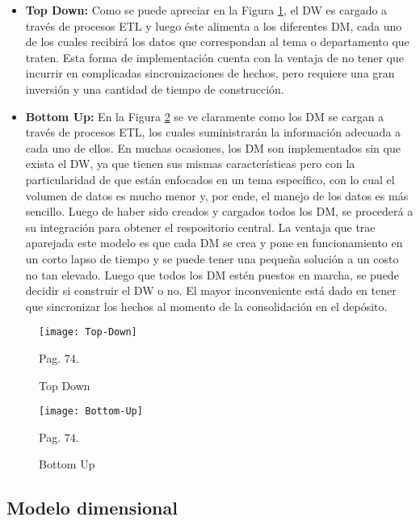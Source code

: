 \documentclass[a4paper,11pt]{article}
\begin{document}
\begin{flushleft}
    \begin{itemize}
      \item \textbf{Top Down:} Como se puede apreciar en la Figura \ref{top_down}, el DW es cargado a través de procesos ETL y luego éste alimenta a los
      diferentes DM, cada uno de los cuales recibirá los datos que correspondan al tema o departamento que traten. Esta forma de implementación cuenta
      con la ventaja de no tener que incurrir en complicadas sincronizaciones de hechos, pero requiere una gran inversión y una cantidad de tiempo de
      construcción.
      \item \textbf{Bottom Up:} En la Figura \ref{bottom_up} se ve claramente como los DM se cargan a través de procesos ETL, los cuales suministrarán la
      información adecuada a cada uno de ellos. En muchas ocasiones, los DM son implementados sin que exista el DW, ya que tienen sus mismas 
      características pero con la particularidad de que están enfocados en un tema específico, con lo cual el volumen de datos es mucho menor y, por ende,
      el manejo de los datos es más sencillo. Luego de haber sido creados y cargados todos los DM, se procederá a su integración para obtener el
      respositorio central. La ventaja que trae aparejada este modelo es que cada DM se crea y pone en funcionamiento en un corto lapso de tiempo y se
      puede tener una pequeña solución a un costo no tan elevado. Luego que todos los DM estén puestos en marcha, se puede decidir si construir el DW o no.
      El mayor inconveniente está dado en tener que sincronizar los hechos al momento de la consolidación en el depósito.
    \end{itemize}
    
    \begin{figure}
      \begin{center}
        \texttt{[image: Top-Down]}
        \caption{Top Down} \cite{hefestov2} Pag. 74.
        \label{top_down}
      \end{center}
    \end{figure}
    
    \begin{figure}
      \begin{center}
        \texttt{[image: Bottom-Up]}
        \caption{Bottom Up} \cite{hefestov2} Pag. 74.
        \label{bottom_up}
      \end{center}
    \end{figure}
    
    
    \subsection{Modelo dimensional}
    

\end{flushleft}
\end{document}
